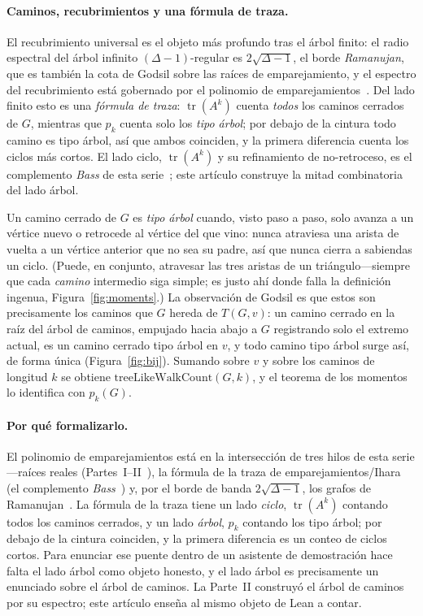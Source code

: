 \documentclass[11pt]{article}
\DeclareMathOperator{\tr}{tr}
\begin{document}
\paragraph{Caminos, recubrimientos y una f\'ormula de traza.} El recubrimiento universal es el objeto
m\'as profundo tras el \'arbol finito: el radio espectral del \'arbol infinito $(\Delta-1)$-regular es
$2\sqrt{\Delta-1}$, el borde \emph{Ramanujan}, que es tambi\'en la cota de Godsil sobre las ra\'ices de
emparejamiento, y el espectro del recubrimiento est\'a gobernado por el polinomio de
emparejamientos~\cite{AngelFriedmanHoory,Spier2025}. Del lado finito esto es una \emph{f\'ormula de
traza}: $\tr(A^k)$ cuenta \emph{todos} los caminos cerrados de $G$, mientras que $p_k$ cuenta solo los
\emph{tipo \'arbol}; por debajo de la cintura todo camino es tipo \'arbol, as\'i que ambos coinciden, y
la primera diferencia cuenta los ciclos m\'as cortos. El lado ciclo, $\tr(A^k)$ y su refinamiento de
no-retroceso, es el complemento \emph{Bass} de esta serie~\cite{Bass,Hashimoto,IharaBass}; este
art\'iculo construye la mitad combinatoria del lado \'arbol.

Un camino cerrado de $G$ es \emph{tipo \'arbol} cuando, visto paso a paso, solo avanza a un v\'ertice
nuevo o retrocede al v\'ertice del que vino: nunca atraviesa una arista de vuelta a un v\'ertice
anterior que no sea su padre, as\'i que nunca cierra a sabiendas un ciclo. (Puede, en conjunto,
atravesar las tres aristas de un tri\'angulo---siempre que cada \emph{camino} intermedio siga simple;
es justo ah\'i donde falla la definici\'on ingenua, Figura~\ref{fig:moments}.) La observaci\'on de
Godsil es que estos son precisamente los caminos que $G$ hereda de $T(G,v)$: un camino cerrado en la
ra\'iz del \'arbol de caminos, empujado hacia abajo a $G$ registrando solo el extremo actual, es un
camino cerrado tipo \'arbol en $v$, y todo camino tipo \'arbol surge as\'i, de forma \'unica
(Figura~\ref{fig:bij}). Sumando sobre $v$ y sobre los caminos de longitud $k$ se obtiene
$\mathrm{treeLikeWalkCount}(G,k)$, y el teorema de los momentos lo identifica con $p_k(G)$.

\paragraph{Por qu\'e formalizarlo.} El polinomio de emparejamientos est\'a en la intersecci\'on de tres
hilos de esta serie---ra\'ices reales (Partes~I--II~\cite{PartI,PartII}), la f\'ormula de la traza de
emparejamientos/Ihara (el complemento \emph{Bass}~\cite{Bass}) y, por el borde de banda
$2\sqrt{\Delta-1}$, los grafos de Ramanujan~\cite{MSS}. La f\'ormula de la traza tiene un lado
\emph{ciclo}, $\tr(A^k)$ contando todos los caminos cerrados, y un lado \emph{\'arbol}, $p_k$ contando
los tipo \'arbol; por debajo de la cintura coinciden, y la primera diferencia es un conteo de ciclos
cortos. Para enunciar ese puente dentro de un asistente de demostraci\'on hace falta el lado \'arbol
como objeto honesto, y el lado \'arbol es precisamente un enunciado sobre el \'arbol de caminos. La
Parte~II construy\'o el \'arbol de caminos por su espectro; este art\'iculo ense\~na al mismo objeto de
Lean a contar.
\end{document}
